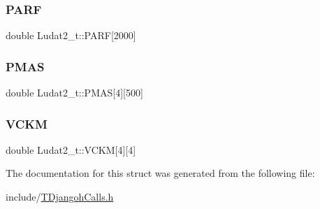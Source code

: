 \subsubsection{\texorpdfstring{P\+A\+RF}{PARF}}
{\footnotesize\ttfamily double Ludat2\+\_\+t\+::\+P\+A\+RF\mbox{[}2000\mbox{]}}

\mbox{\label{struct_ludat2__t_a3ba40c50d21f9c3e2a9f27a1630e9199}} 
\subsubsection{\texorpdfstring{P\+M\+AS}{PMAS}}
{\footnotesize\ttfamily double Ludat2\+\_\+t\+::\+P\+M\+AS\mbox{[}4\mbox{]}\mbox{[}500\mbox{]}}

\mbox{\label{struct_ludat2__t_a20d157be63ce36f91641642e81bb7334}} 
\subsubsection{\texorpdfstring{V\+C\+KM}{VCKM}}
{\footnotesize\ttfamily double Ludat2\+\_\+t\+::\+V\+C\+KM\mbox{[}4\mbox{]}\mbox{[}4\mbox{]}}



The documentation for this struct was generated from the following file\+:\begin{DoxyCompactItemize}
\item 
include/\hyperlink{_t_djangoh_calls_8h}{T\+Djangoh\+Calls.\+h}\end{DoxyCompactItemize}
